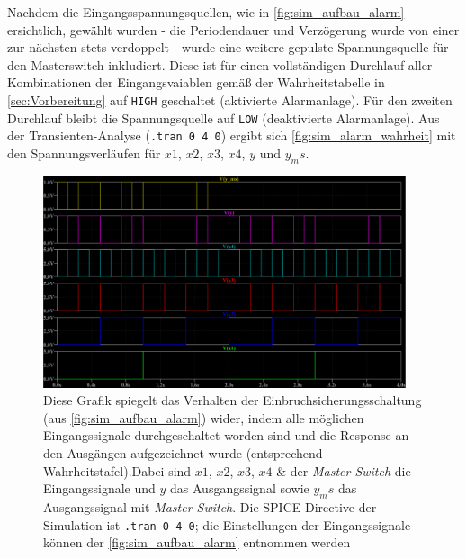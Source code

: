 \documentclass[12pt,english,ngerman]{scrartcl}
\begin{document}
Nachdem die Eingangsspannungsquellen, wie in \autoref{fig:sim_aufbau_alarm} ersichtlich,
gewählt wurden - die Periodendauer und Verzögerung wurde von einer
zur nächsten stets verdoppelt - wurde eine weitere gepulste Spannungsquelle für
den Masterswitch inkludiert. Diese ist für einen vollständigen Durchlauf
aller Kombinationen der Eingangsvaiablen gemäß der Wahrheitstabelle
in \autoref{sec:Vorbereitung} auf \texttt{HIGH} geschaltet (aktivierte Alarmanlage). 
Für den zweiten Durchlauf bleibt die Spannungsquelle auf \texttt{LOW} (deaktivierte Alarmanlage).
Aus der Transienten-Analyse (\texttt{.tran 0 4 0}) ergibt sich \autoref{fig:sim_alarm_wahrheit}
mit den Spannungsverläufen für $x1$, $x2$, $x3$, $x4$, $y$ und $y_ms$.
\begin{figure}[H]
  \centering
    \includegraphics[width=0.95\textwidth]{./simdaten_lab/logic/verlaufmaster.png}
  \caption{Diese Grafik spiegelt das Verhalten der
    Einbruchsicherungsschaltung (aus \autoref{fig:sim_aufbau_alarm}) wider, indem alle
    möglichen Eingangssignale durchgeschaltet worden sind und die Response an den
    Ausgängen aufgezeichnet wurde (entsprechend Wahrheitstafel).Dabei sind $x1$, $x2$, $x3$, $x4$ \&
    der \textit{Master-Switch} die Eingangssignale und $y$ das Ausgangssignal sowie $y_ms$
    das Ausgangssignal mit \textit{Master-Switch}. Die
    SPICE-Directive der Simulation ist \texttt{.tran 0 4 0}; die
    Einstellungen der Eingangssignale können der \autoref{fig:sim_aufbau_alarm}
  entnommen werden}
  \label{fig:sim_alarm_wahrheit}
\end{figure}


\end{document}
